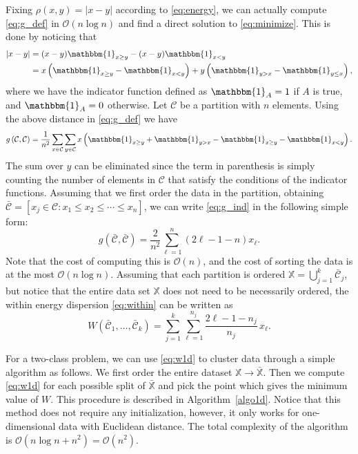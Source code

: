 \documentclass[aps,preprint,nofootinbib,floatfix]{revtex4-1}
\newcommand\C{{\mathcal{C}}}
\newcommand\OO{{\mathcal{O}}}
\newcommand{\Ind}[1]{\mathbbm{1}_{#1}}
\begin{document}
Fixing
$\rho(x,y) = |x - y|$ according to \eqref{eq:energy}, we can actually compute 
\eqref{eq:g_def} in $\OO(n \log n)$ and find
a direct solution to \eqref{eq:minimize}. 
This is done by noticing that
\begin{equation}
\begin{aligned}
|x - y|  &= (x-y)\Ind{x \ge y} -
(x-y) \Ind{x < y}  \\
&= 
x \left( \Ind{x \ge y} - \Ind{x < y} \right)  + 
y \left( \Ind{y > x} - \Ind{y \le x} \right)  ,
\end{aligned}
\end{equation}
where we have the indicator function defined as
$\Ind{A}=1$ if $A$ is true, and $\Ind{A}=0$ otherwise. 
Let $\C$ be a partition with
$n$ elements. Using the above distance in \eqref{eq:g_def} we have
\begin{equation}
\label{eq:g_ind}
g\left(\C,\C\right) = \dfrac{1}{n^2} \sum_{x \in \C} 
\sum_{y \in \C} 
x \left(
\Ind{x \ge y} + \Ind{y > x} - 
\Ind{x \ge y}-\Ind{x < y} \right) .
\end{equation}
The sum over $y$ can be eliminated since the term in
parenthesis is simply counting the number of elements in $\C$ that satisfy
the conditions of the indicator functions. Assuming
that we first order the data in the partition, obtaining
$\bar{\C} = [ x_j \in \C: x_1 \le x_2 \le \dotsm \le x_{n}]$, we
can write \eqref{eq:g_ind} in the following simple form:
\begin{equation}
\label{eq:g1d}
g\left(\bar{\C}, \bar{\C}\right) = 
\dfrac{2}{n^2} \sum_{\ell=1}^n (2\ell - 1 - n) x_\ell .
\end{equation}
Note that the cost of computing this is $\OO(n)$, and the cost of
sorting the data
is at the most $\OO(n\log n)$.
Assuming that each partition is ordered  $\mathbb{X} = \bigcup_{j=1}^k
\bar{\C}_j$, but notice that the entire data set $\mathbb{X}$ does not 
need to be necessarily ordered, the within energy dispersion
\eqref{eq:within} can be written as
\begin{equation}
\label{eq:w1d}
W\left( \bar{\C}_1,\dotsc,\bar{\C}_k \right) = 
\sum_{j=1}^k \sum_{\ell=1}^{n_j} \dfrac{2\ell - 1 - n_j}{n_j} \, x_\ell.
\end{equation}

For a two-class problem, we can use \eqref{eq:w1d} to cluster data
through a simple algorithm 
as follows. We first order
the entire dataset $\mathbb{X} \to \bar{\mathbb{X}}$. Then 
we compute \eqref{eq:w1d} for each possible split of $\bar{\mathbb{X}}$
and pick the point which gives the minimum value of $W$. 
This procedure is described in Algorithm~\ref{algo1d}. 
Notice that
this method does not require any initialization,
however,
it only works for one-dimensional data with Euclidean distance. The total
complexity of the algorithm is $\OO(n\log n + n^2) = \OO(n^2)$.
\end{document}
